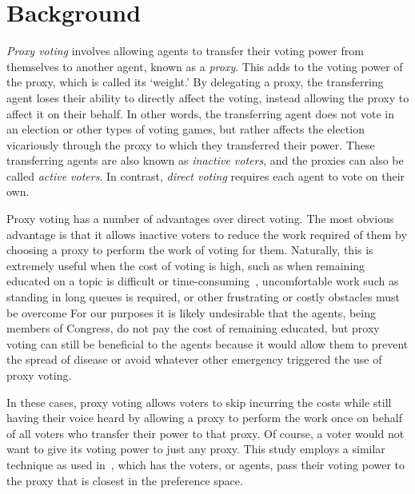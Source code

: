 \section{Background}\label{sec:background}
\textit{Proxy voting} involves allowing agents to transfer their voting power
from themselves to another agent, known as a \textit{proxy}.
This adds to the voting power of the proxy, which is called its `weight.'
By delegating a proxy, the transferring agent loses their ability to directly affect the
voting, instead allowing the proxy to affect it on their behalf.
In other words, the transferring agent does not vote in an election or other types of
voting games, but rather affects the election vicariously through the proxy to which
they transferred their power.
These transferring agents are also known as \textit{inactive voters}, and the
proxies can also be called \textit{active voters}.
In contrast, \textit{direct voting} requires each agent to vote on their own.

Proxy voting has a number of advantages over direct voting.
The most obvious advantage is that it allows inactive voters to reduce the work
required of them by choosing a proxy to perform the work of voting for them.
Naturally, this is extremely useful when the cost of voting is high, such as
when remaining educated on a topic is difficult or
time-consuming~\cite{Mueller1972}, uncomfortable work such as standing in
long queues is required, or other frustrating or costly obstacles must be overcome
For our purposes it is likely undesirable that the agents, being members of Congress,
do not pay the cost of remaining educated, but proxy voting can still be beneficial
to the agents because it would allow them to prevent the spread of disease or avoid
whatever other emergency triggered the use of proxy voting.

In these cases, proxy voting allows voters to skip incurring the costs while
still having their voice heard by allowing a proxy to perform the work once on
behalf of all voters who transfer their power to that proxy.
Of course, a voter would not want to give its voting power to just any proxy.
This study employs a similar technique as used in~\cite{Cohensius2017}, which has the
voters, or agents, pass their voting power to the proxy that is closest in the
preference space.


